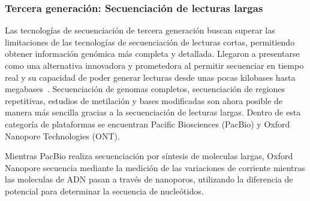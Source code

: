 



\subsubsection{Tercera generación: Secuenciación de lecturas largas}
Las tecnologías de secuenciación de tercera generación buscan superar las limitaciones de las tecnologías de secuenciación de lecturas cortas, permitiendo obtener información genómica más completa y detallada. %
Llegaron a presentarse como una alternativa innovadora y prometedora al permitir secuenciar en tiempo real y su capacidad de poder generar lecturas desde unas pocas kilobases hasta megabases~\cite{amarasinghe2020opportunities}. 
Secuenciación de genomas completos, secuenciación de regiones repetitivas, estudios de metilación y bases modificadas son ahora posible de manera más sencilla gracias a la secuenciación de lecturas largas. 
Dentro de esta categoría de plataformas se encuentran Pacific Biosciences (PacBio) y Oxford Nanopore Technologies (ONT).

Mientras PacBio realiza secuenciación por síntesis de moleculas largas, %
Oxford Nanopore secuencia mediante la medición de las variaciones de corriente mientras las moleculas de ADN pasan a través de nanoporos, utilizando la diferencia de potencial para determinar la secuencia de nucleótidos.


